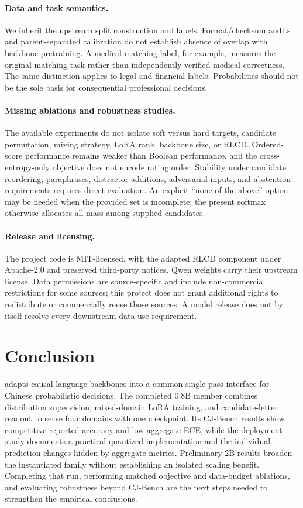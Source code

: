 \paragraph{Data and task semantics.}
We inherit the upstream split construction and labels. Format/checksum audits and parent-separated calibration do not establish absence of overlap with backbone pretraining. A medical matching label, for example, measures the original matching task rather than independently verified medical correctness. The same distinction applies to legal and financial labels. Probabilities should not be the sole basis for consequential professional decisions.

\paragraph{Missing ablations and robustness studies.}
The available experiments do not isolate soft versus hard targets, candidate permutation, mixing strategy, LoRA rank, backbone size, or RLCD. Ordered-score performance remains weaker than Boolean performance, and the cross-entropy-only objective does not encode rating order. Stability under candidate reordering, paraphrases, distractor additions, adversarial inputs, and abstention requirements requires direct evaluation. An explicit ``none of the above'' option may be needed when the provided set is incomplete; the present softmax otherwise allocates all mass among supplied candidates.

\paragraph{Release and licensing.}
The project code is MIT-licensed, with the adapted RLCD component under Apache-2.0 and preserved third-party notices. Qwen weights carry their upstream license. Data permissions are source-specific and include non-commercial restrictions for some sources; this project does not grant additional rights to redistribute or commercially reuse those sources. A model release does not by itself resolve every downstream data-use requirement.

\section{Conclusion}
\model{} adapts causal language backbones into a common single-pass interface for Chinese probabilistic decisions. The completed 0.8B member combines distribution supervision, mixed-domain LoRA training, and candidate-letter readout to serve four domains with one checkpoint. Its CJ-Bench results show competitive reported accuracy and low aggregate ECE, while the deployment study documents a practical quantized implementation and the individual prediction changes hidden by aggregate metrics. Preliminary 2B results broaden the instantiated family without establishing an isolated scaling benefit. Completing that run, performing matched objective and data-budget ablations, and evaluating robustness beyond CJ-Bench are the next steps needed to strengthen the empirical conclusions.

